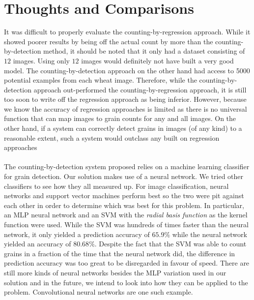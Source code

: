 \section{Thoughts and Comparisons}
It was difficult to properly evaluate the counting-by-regression approach. While it showed poorer results by being off the actual count by more than the counting-by-detection method, it should be noted that it only had a dataset consisting of $12$ images. Using only $12$ images would definitely not have built a very good model. The counting-by-detection approach on the other hand had access to 5000 potential examples from each wheat image. Therefore, while the counting-by-detection approach out-performed the counting-by-regression approach, it is still too soon to write off the regression approach as being inferior. However, because we know the accuracy of regression approaches is limited as there is no universal function that can map images to grain counts for any and all images. On the other hand, if a system can correctly detect grains in images (of any kind) to a reasonable extent, such a system would outclass any built on regression approaches\\ \\
%
The counting-by-detection system proposed relies on a machine learning classifier for grain detection. Our solution makes use of a neural network. We tried other classifiers to see how they all measured up. For image classification, neural networks and support vector machines perform best so the two were pit against each other in order to determine which was best for this problem. In particular, an MLP neural network and an SVM with the \textit{radial basis function} as the kernel function were used. While the SVM was hundreds of times faster than the neural network, it only yielded a prediction accuracy of $65.9\%$ while the neural network yielded an accuracy of $80.68\%$. Despite the fact that the SVM was able to count grains in a fraction of the time that the neural network did, the difference in prediction accuracy was too great to be disregarded in favour of speed. There are still more kinds of neural networks besides the MLP variation used in our solution and in the future, we intend to look into how they can be applied to the problem. Convolutional neural networks are one such example.\\ \\
%
